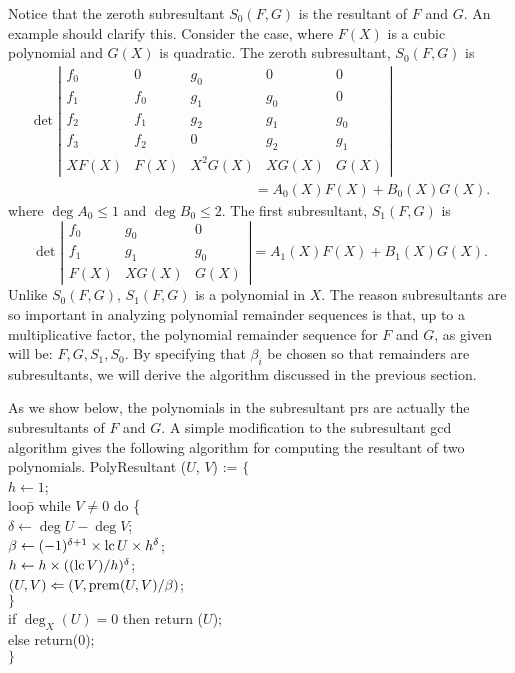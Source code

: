 Notice that the zeroth subresultant $S_0(F, G)$ is the resultant of $F$ and
$G$.  An example should clarify this.  Consider the case, where $F(X)$ is a
cubic polynomial and $G(X)$ is quadratic.  The zeroth subresultant,
$S_{0}(F, G)$ is
\[
\begin{aligned}
\det \left|
 \begin{array}{ccccc}
    f_{0} & 0 & g_{0} & 0 & 0 \\
    f_{1} & f_{0} & g_{1} & g_{0} & 0 \\
    f_{2} & f_{1} & g_{2} & g_{1} & g_{0} \\
    f_{3} & f_{2} & 0 & g_{2} & g_{1} \\
    X F(X) & F(X) & X^{2} G(X) & X G(X) & G(X)
 \end{array} \right| \\
  \qquad\qquad\qquad\qquad\qquad\qquad\qquad\qquad
     = A_{0}(X) F(X) + B_{0}(X) G(X).
\end{aligned}
\]
where $\deg A_{0} \le 1$ and $\deg B_{0} \le 2$.  The first subresultant,
$S_{1}(F, G)$ is 
\[
\det \left|
  \begin{array}{ccc}
    f_{0} & g_{0} & 0 \\
    f_{1} & g_{1} & g_{0} \\
    F(X) & X G(X) & G(X) 
  \end{array} \right|= A_{1}(X) F(X) + B_{1}(X) G(X).
\]
Unlike $S_{0}(F, G)$, $S_{1}(F, G)$ is a polynomial in $X$.  The
reason subresultants are so important in analyzing polynomial
remainder sequences is that, up to a multiplicative factor, the
polynomial remainder sequence for $F$ and $G$, as given will be: $F,
G, S_{1}, S_{0}$. By specifying that $\beta_i$ be chosen so that
remainders are subresultants, we will derive the algorithm discussed
in the previous section.  

As we show below, the polynomials in the subresultant {\sc prs} are
actually the subresultants of $F$ and $G$.  A simple modification to
the subresultant {\sc gcd} algorithm gives the following algorithm for
computing the resultant of two polynomials.
\begindsacode
PolyResultant ($U$, $V$) := $\{$\\
\> $h \leftarrow 1$; \\
\> loo\=p while $V \not= 0$  do \{ \\
\> \> $\delta \leftarrow \deg U - \deg V$; \\
\> \> $\beta \leftarrow (-1)^{\delta+1} \times \operatorname{lc} U \times h^{\delta}$; \\
\> \> $h \leftarrow h \times ((\operatorname{lc} V)/h)^{\delta}$; \\
\> \> $(U, V) \Leftarrow (V, \mathop{\rm prem}\nolimits (U, V)/\beta)$; \\
\> \> $\}$ \\
\> if $\deg_X(U) = 0$ then return ($U$); \\
\>\> else return($0$); \\
\> $\}$
\enddsacode 

